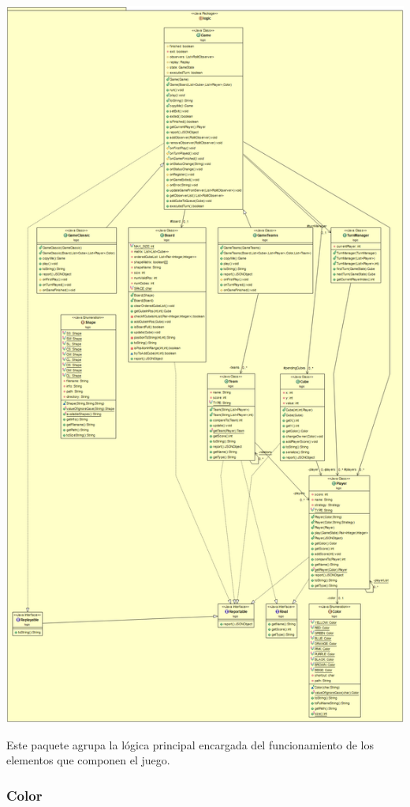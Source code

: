 \documentclass[../DocumentoOficial.tex]{subfiles}
\begin{document}
\begin{center}
\includegraphics[scale=0.27]{Logic-sprint7.png}
\end{center}

Este paquete agrupa la lógica principal encargada del funcionamiento de los elementos que componen el juego.

\subsubsection{Color}
\end{document}
